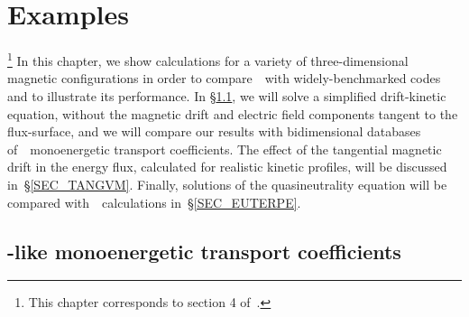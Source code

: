 \chapter{Examples}\label{CHAP_EX}


\footnote{This chapter corresponds to section 4 of~\citep{velasco2019knosos}.}
In this chapter, we show calculations for a variety of three-dimensional magnetic configurations in order to compare~\KNOSOS~with widely-benchmarked codes and to illustrate its performance. In \S\ref{SEC_DKES}, we will solve a simplified drift-kinetic equation, without the magnetic drift and electric field components tangent to the flux-surface, and we will compare our results with bidimensional databases of~\DKES ~monoenergetic transport coefficients. The effect of the tangential magnetic drift in the energy flux, calculated for realistic kinetic profiles, will be discussed in~\S\ref{SEC_TANGVM}. Finally, solutions of the quasineutrality equation will be compared with~\EUTERPE~calculations in~\S\ref{SEC_EUTERPE}.
 

\section{\DKES-like monoenergetic transport coefficients}\label{SEC_DKES}


